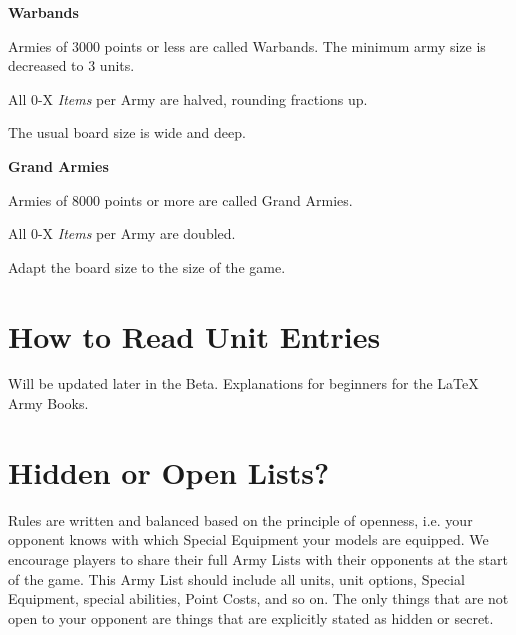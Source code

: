 \begin{multicols}{2}\raggedcolumns

\begin{center}\textbf{Warbands}\end{center}

Armies of 3000 points or less are called Warbands. The minimum army size is decreased to 3 units.

All 0-X \textit{Items} per Army are halved, rounding fractions up.

The usual board size is  wide and  deep.

\columnbreak

\begin{center}\textbf{Grand Armies}\end{center}

Armies of 8000 points or more are called Grand Armies.

All 0-X \textit{Items} per Army are doubled.

Adapt the board size to the size of the game.

\end{multicols}

\section{How to Read Unit Entries}
\label{how_to_read_unit_entries}

Will be updated later in the Beta. Explanations for beginners for the \LaTeX{} Army Books.

\section{Hidden or Open Lists?}
\label{hidden_or_open_lists}

Rules are written and balanced based on the principle of openness, i.e. your opponent knows with which Special Equipment your models are equipped. We encourage players to share their full Army Lists with their opponents at the start of the game. This Army List should include all units, unit options, Special Equipment, special abilities, Point Costs, and so on. The only things that are not open to your opponent are things that are explicitly stated as hidden or secret.

